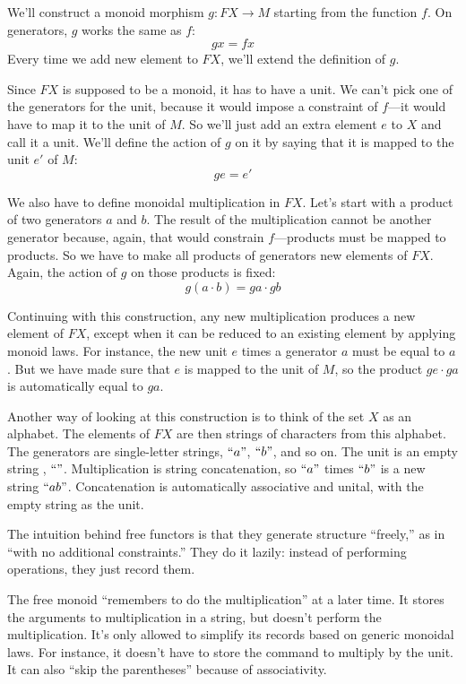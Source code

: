 \documentclass[DaoFP]{subfiles}
\begin{document}
We'll construct a monoid morphism $g \colon F X \to M$ starting from the function $f$. On generators, $g$ works the same as $f$:
\[ g x = f x \]
Every time we add new element to $F X$, we'll extend the definition of $g$.

Since $F X$ is supposed to be a monoid, it has to have a unit. We can't pick one of the generators for the unit, because it would impose a constraint of $f$---it would have to map it to the unit of $M$. So we'll just add an extra element $e$ to $X$ and call it a unit. We'll define the action of $g$ on it by saying that it is mapped to the unit $e'$ of $M$:
\[ g e = e' \]

We also have to define monoidal multiplication in $F X$. Let's start with a product of two generators $a$ and $b$. The result of the multiplication cannot be another generator because, again, that would constrain $f$---products must be mapped to products. So we have to make all products of generators new elements of $F X$. Again, the action of $g$ on those products is fixed:
\[ g (a \cdot b)  = g a \cdot g b\]

Continuing with this construction, any new multiplication produces a new element of $F X$, except when it can be reduced to an existing element by applying monoid laws. For instance, the new unit $e$ times a generator $a$ must be equal to $a$. But we have made sure that $e$ is mapped to the unit of $M$, so the product $g e \cdot g a$ is automatically equal to $g a$.

Another way of looking at this construction is to think of the set $X$ as an alphabet. The elements of $FX$ are then strings of characters from this alphabet. The generators are single-letter strings, $``a"$, $``b"$, and so on. The unit is an empty string , $``"$. Multiplication is string concatenation, so  $``a"$ times $``b"$ is a new string  $``ab"$. Concatenation is automatically associative and unital, with the empty string as the unit.

The intuition behind free functors is that they generate structure ``freely,'' as in ``with no additional constraints.'' They do it lazily: instead of performing operations, they just record them. 

The free monoid ``remembers to do the multiplication'' at a later time. It stores the arguments to multiplication in a string, but doesn't perform the multiplication. It's only allowed to simplify its records based on generic monoidal laws. For instance, it doesn't have to store the command to multiply by the unit. It can also ``skip the parentheses'' because of associativity. 
\end{document}
